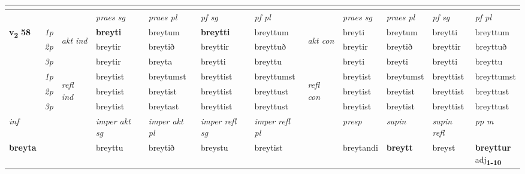 \begin{longtable}[l]{X>{\footnotesize\itshape}llXXXXlXXXX}
\midrule
& \\
\midrule
 & &   & \textit{praes sg}  & \textit{praes pl}    & \textit{ pf sg} & \textit{pf pl} & & \textit{praes sg}  & \textit{praes pl}    & \textit{pf sg} & \textit{pf pl }  \\ \cmidrule{4-7} \cmidrule{9-12}
 \multirow{2}{*}{{{\textbf{v{\textsubscript{2}}} \Large{\textbf{58}}}}}  & 1p & \multirow{3}{*}{\begin{turn}{90}\textit{akt ind}\end{turn}} & \textbf{breyti} & breytum & \textbf{breytti} & breyttum & \multirow{3}{*}{\begin{turn}{90}\textit{akt con}\end{turn}} &breyti & breytum & breytti & breyttum\\*
 & 2p &  &  breytir  & breytið & breyttir & breyttuð & & breytir & breytið & breyttir & breyttuð \\*
 & 3p &  & breytir & breyta & breytti & breyttu & & breyti & breyti& breytti & breyttu \\*
\cmidrule{4-7} \cmidrule{9-12}
 & 1p & \multirow{3}{*}{\begin{turn}{90}\textit{refl ind}\end{turn}}  & breytist & breytumst & breyttist & breyttumst & \multirow{3}{*}{\begin{turn}{90}\textit{refl con}\end{turn}}  &breytist & breytumst & breyttist & breyttumst \\*
 & 2p &  & breytist & breytist & breyttist & breyttust & &breytist & breytist & breyttist & breyttust \\*
 & 3p  & & breytist & breytast & breyttist & breyttust & & breytist & breytist& breyttist & breyttust \\*
\cmidrule{4-7} \cmidrule{9-12}

   {\textit{inf}} & &  & \textit{imper akt sg} & \textit{imper akt pl} & \textit{imper refl sg} & \textit{imper refl pl} && \textit{presp} & \textit{supin} & \textit{supin refl} & \textit{pp m} \\*
  {\textbf{breyta}} & && breyttu  & breytið & breystu & breytist && breytandi &  \textbf{breytt} & breyst & \specialcell{\textbf{breyttur} \\ adj\textbf{\textsubscript{1-10}}} \\*

\midrule


\end{longtable}
